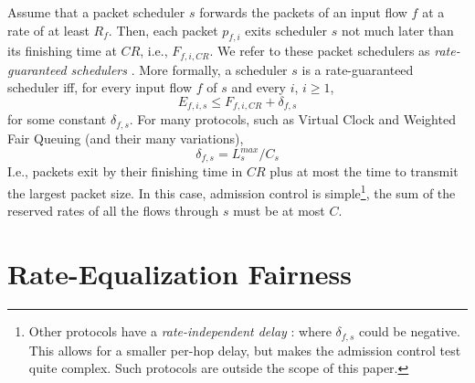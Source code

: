 \documentclass[conference]{IEEEtran}
\begin{document}
Assume that a packet scheduler $s$ forwards the packets of an input flow $f$ at 
a rate of at least $R_f$. Then, each packet $p_{f,i}$ exits scheduler $s$ not 
much later than its finishing time at $CR$, i.e., $F_{f,i,CR}$. We refer to 
these packet schedulers as {\em rate-guaranteed schedulers} 
\cite{Cobb-Flow-Theory-ToN,leaveintime,NOSSDAV-95-Vin}. More formally, a 
scheduler $s$ is a rate-guaranteed scheduler iff, for every input flow $f$ of 
$s$ and every $i$, $i \geq 1$,
\[
E_{f,i,s} \leq F_{f,i,CR} + \delta_{f,s}
\]
for some constant $\delta_{f,s}$. For many protocols, such as Virtual Clock 
\cite{VC-Lam, VC-Lixia} and Weighted Fair Queuing \cite{GPS-Parekh}
(and their many variations),
\[
\delta_{f,s} = L^{max}_s/C_s
\]
I.e., packets exit by their finishing time in $CR$ plus at most the time to 
transmit the largest packet size. In this case, admission control is 
simple\footnote{Other protocols have a {\em rate-independent delay} 
\cite{leaveintime,KGShin94}: where $\delta_{f,s}$ could be negative. This 
allows for a smaller per-hop delay, but makes the admission control test quite 
complex. Such protocols are outside the scope of this paper.
},
the sum of the reserved rates of all the flows through $s$ must be at most $C$.



%
\section{Rate-Equalization Fairness}
%
\label{sec:Fairness}
\end{document}
